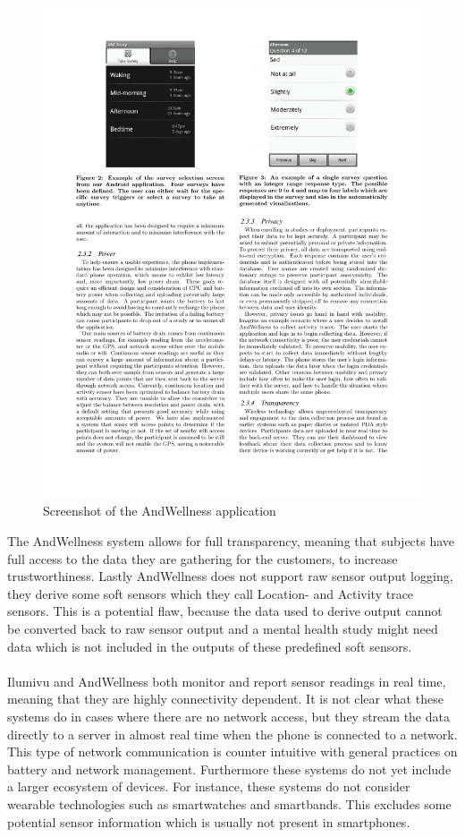 \begin{figure}[!htbp]
	\centering
	\includegraphics[height=0.5\textwidth]{graphic/existing_solutions/and_wellness.pdf}
	\caption[]{Screenshot of the AndWellness application\parencite{hicks2010andwellness}}
	\label{fig:andwellness_screenshot}
\end{figure}
\FloatBarrier

The AndWellness system allows for full transparency, meaning that subjects have full access to the data they are gathering for the customers, to increase trustworthiness. Lastly AndWellness does not support raw sensor output logging, they derive some soft sensors which they call Location- and Activity trace sensors. This is a potential flaw, because the data used to derive output cannot be converted back to raw sensor output and a mental health study might need data which is not included in the outputs of these predefined soft sensors.
\\\\
Ilumivu and AndWellness both monitor and report sensor readings in real time, meaning that they are highly connectivity dependent. It is not clear what these systems do in cases where there are no network access, but they stream the data directly to a server in almost real time when the phone is connected to a network. This type of network communication is counter intuitive with general practices on battery and network management. Furthermore these systems do not yet include a larger ecosystem of devices. For instance, these systems do not consider wearable technologies such as smartwatches and smartbands. This excludes some potential sensor information which is usually not present in smartphones.

